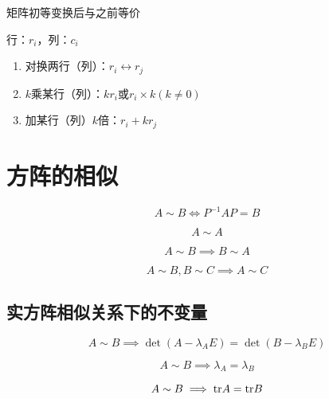 \documentclass{article}
\begin{document}
\begin{theorem}[初等变换]

    矩阵初等变换后与之前等价

    行：$r_i$，列：$c_i$

    \begin{enumerate}
        \item 对换两行（列）：$r_i\leftrightarrow r_j$
        \item $k$乘某行（列）：$kr_i$或$r_i\times k\left(k\neq0\right)$
        \item 加某行（列）$k$倍：$r_i+kr_j$
    \end{enumerate}
\end{theorem}

\section{方阵的相似}

\begin{definition}[相似]
    \[A\sim B\iff P^{-1}AP=B\]
\end{definition}

\begin{theorem}[反身性]
    \[A\sim A\]
\end{theorem}

\begin{theorem}[对称性]
    \[A\sim B\implies B\sim A\]
\end{theorem}

\begin{theorem}[传递性]
    \[A\sim B, B\sim C\implies A\sim C\]
\end{theorem}

\subsection{实方阵相似关系下的不变量}

\begin{theorem}[相似方阵特征多项式相同]
    \[A\sim B\implies\det\left(A-\lambda_A E\right)=\det\left(B-\lambda_B E\right)\]
\end{theorem}

\begin{corollary}[相似方阵特征值相同]
    \[A\sim B\implies\lambda_A=\lambda_B\]
\end{corollary}

\begin{corollary}[相似方阵迹相同]
    \[A\sim B\implies{\rm tr}A={\rm tr}B\]
\end{corollary}
\end{document}
